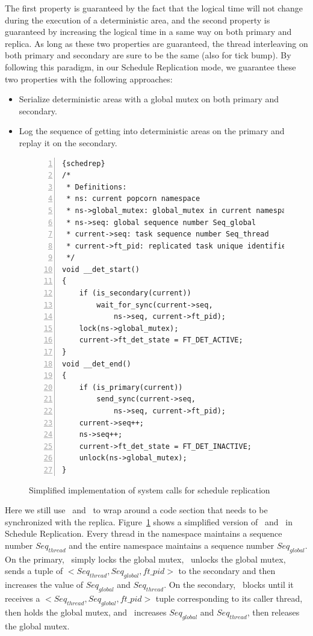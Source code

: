 The first property is guaranteed by the fact that the logical time will not change during the execution of a deterministic area, and the second property is guaranteed by increasing the logical time in a same way on both primary and replica. As long as these two properties are guaranteed, the thread interleaving on both primary and secondary are sure to be the same (also for tick bump). By following this paradigm, in our Schedule Replication mode, we guarantee these two properties with the following approaches:

\begin{itemize}
\item Serialize deterministic areas with a global mutex on both primary and secondary.
\item Log the sequence of getting into deterministic areas on the primary and replay it on the secondary.
\end{itemize}

\begin{figure}
\begin{lstlisting}[numbers=left, frame=single, basicstyle=\small, breaklines]{schedrep}
/*
 * Definitions:
 * ns: current popcorn namespace
 * ns->global_mutex: global_mutex in current namespace
 * ns->seq: global sequence number Seq_global
 * current->seq: task sequence number Seq_thread
 * current->ft_pid: replicated task unique identifier
 */
void __det_start()
{
    if (is_secondary(current))
        wait_for_sync(current->seq, 
            ns->seq, current->ft_pid);
    lock(ns->global_mutex);
    current->ft_det_state = FT_DET_ACTIVE;
}
void __det_end()
{
    if (is_primary(current))
        send_sync(current->seq, 
            ns->seq, current->ft_pid);
    current->seq++;
    ns->seq++;
    current->ft_det_state = FT_DET_INACTIVE;
    unlock(ns->global_mutex);
}
\end{lstlisting}
\caption{Simplified implementation of system calls for schedule replication}
\label{f:schedrep_c}
\end{figure}


Here we still use \detstart\ and \detend\ to wrap around a code section that needs to be synchronized with the replica. Figure~\ref{f:schedrep_c} shows a simplified version of \detstart\ and \detend\ in Schedule Replication.  Every thread in the namespace maintains a sequence number $Seq_{thread}$ and the entire namespace maintains a sequence number $Seq_{global}$. On the primary, \detstart\ simply locks the global mutex, \detend\ unlocks the global mutex, sends a tuple of $< Seq_{thread}, Seq_{global}, ft\_pid >$ to the secondary and then increases the value of $Seq_{global}$ and $Seq_{thread}$. On the secondary, \detstart\ blocks until it receives a $< Seq_{thread}, Seq_{global}, ft\_pid >$ tuple corresponding to its caller thread, then holds the global mutex, and \detend\ increases $Seq_{global}$ and $Seq_{thread}$, then releases the global mutex.

